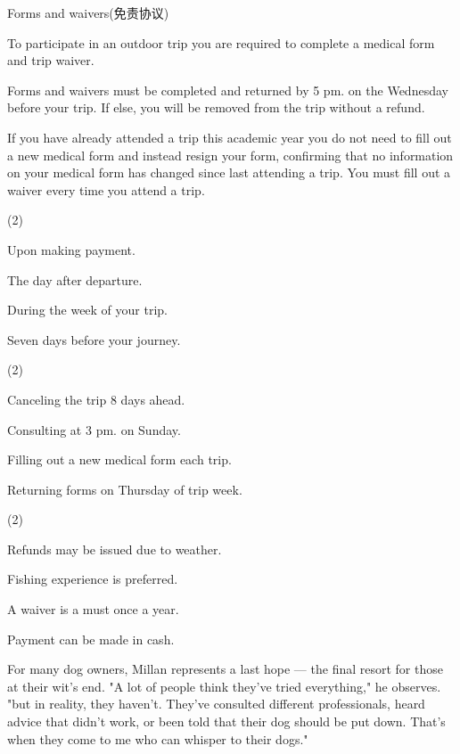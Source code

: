 \documentclass{英语试卷}
\begin{document}
\par Forms and waivers(免责协议)\par
\par To participate in an outdoor trip you are required to complete a medical form and trip waiver.\par
\par Forms and waivers must be completed and returned by 5 pm. on the Wednesday before your trip. If else, you will be removed from the trip without a refund.\par
\par If you have already attended a trip this academic year you do not need to fill out a new medical form and instead resign your form, confirming that no information on your medical form has changed since last attending a trip. You must fill out a waiver every time you attend a trip.\par
{}
\begin{choices}(2)
  \item Upon making payment.
  \item The day after departure.
  \item During the week of your trip.
  \item Seven days before your journey.
\end{choices}
\begin{choices}(2)
  \item Canceling the trip 8 days ahead.
  \item Consulting at 3 pm. on Sunday.
  \item Filling out a new medical form each trip.
  \item Returning forms on Thursday of trip week.
\end{choices}
\begin{choices}(2)
  \item Refunds may be issued due to weather.
  \item Fishing experience is preferred.
  \item A waiver is a must once a year.
  \item Payment can be made in cash.
\end{choices}
\par For many dog owners, Millan represents a last hope — the final resort for those at their wit's end. "A lot of people think they've tried everything," he observes. "but in reality, they haven't. They've consulted different professionals, heard advice that didn't work, or been told that their dog should be put down. That's when they come to me who can whisper to their dogs."\par
\end{document}
